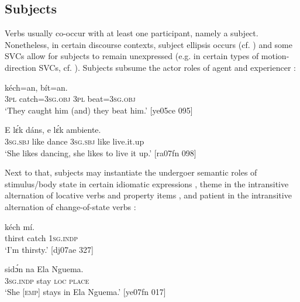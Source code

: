 \subsection{Subjects}

Verbs usually co-occur with at least one participant, namely a subject. Nonetheless, in certain discourse contexts, subject ellipsis occurs (cf. ) and some SVCs allow for subjects to remain unexpressed (e.g. in certain types of motion-direction SVCs, cf. ). Subjects subsume the actor roles of agent  and experiencer :


\ea%
    \label{ex:key:1039}
    \gll {}  kéch=an,      bít=an.\\
\textsc{3pl}  catch=\textsc{3sg.obj}  \textsc{3pl}  beat=\textsc{3sg.obj}\\

\glt ‘They caught him (and) they beat him.’ [ye05ce 095]
\z


\ea%
    \label{ex:key:1040}
    \gll E    lɛ́k  dáns,  e    lɛ́k  ambiente.\\
\textsc{3sg.sbj}  like  dance  \textsc{3sg.sbj}  like  live.it.up\\

\glt ‘She likes dancing, she likes to live it up.’ [ra07fn 098]
\z

Next to that, subjects may instantiate the undergoer semantic roles of stimulus/body state in certain idiomatic expressions , theme in the intransitive alternation of locative verbs  and property items , and patient in the intransitive alternation of change-of-state verbs :


\ea%
    \label{ex:key:1041}
    \gll {}  kéch  mí.\\
thirst  catch  \textsc{1sg.indp}\\

\glt ‘I’m thirsty.’ [dj07ae 327]
\z


\ea%
    \label{ex:key:1042}
    \gll {}    sidɔ́n  na  Ela Nguema.\\
\textsc{3sg.indp}  stay    \textsc{loc}  \textsc{place}\\

\glt ‘She [\textsc{emp}] stays in Ela Nguema.’ [ye07fn 017]
\z


